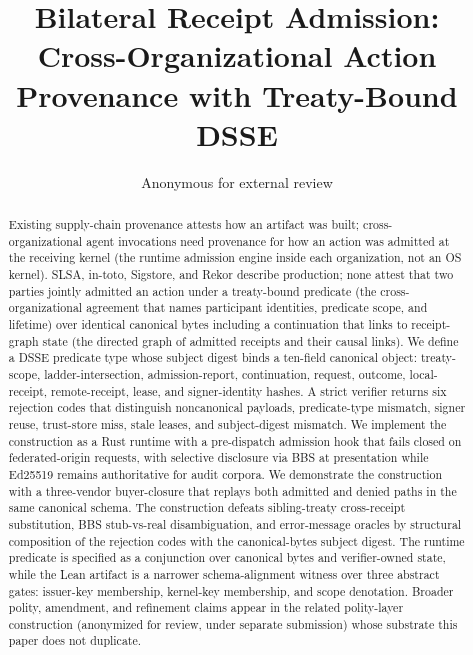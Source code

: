\documentclass[sigconf,anonymous,review,nonacm]{acmart}
\title{Bilateral Receipt Admission: Cross-Organizational Action Provenance with Treaty-Bound DSSE}
\author{Anonymous for external review}
\affiliation{\institution{Anonymous Institution}}
\begin{document}
\begin{abstract}
Existing supply-chain provenance attests how an artifact was built; cross-organizational agent invocations need provenance for how an action was admitted at the receiving kernel (the runtime admission engine inside each organization, not an OS kernel). SLSA, in-toto, Sigstore, and Rekor describe production; none attest that two parties jointly admitted an action under a treaty-bound predicate (the cross-organizational agreement that names participant identities, predicate scope, and lifetime) over identical canonical bytes including a continuation that links to receipt-graph state (the directed graph of admitted receipts and their causal links). We define a DSSE predicate type whose subject digest binds a ten-field canonical object: treaty-scope, ladder-intersection, admission-report, continuation, request, outcome, local-receipt, remote-receipt, lease, and signer-identity hashes. A strict verifier returns six rejection codes that distinguish noncanonical payloads, predicate-type mismatch, signer reuse, trust-store miss, stale leases, and subject-digest mismatch. We implement the construction as a Rust runtime with a pre-dispatch admission hook that fails closed on federated-origin requests, with selective disclosure via BBS at presentation while Ed25519 remains authoritative for audit corpora. We demonstrate the construction with a three-vendor buyer-closure that replays both admitted and denied paths in the same canonical schema. The construction defeats sibling-treaty cross-receipt substitution, BBS stub-vs-real disambiguation, and error-message oracles by structural composition of the rejection codes with the canonical-bytes subject digest. The runtime predicate is specified as a conjunction over canonical bytes and verifier-owned state, while the Lean artifact is a narrower schema-alignment witness over three abstract gates: issuer-key membership, kernel-key membership, and scope denotation. Broader polity, amendment, and refinement claims appear in the related polity-layer construction (anonymized for review, under separate submission) whose substrate this paper does not duplicate.
\end{abstract}

\maketitle













\end{document}
